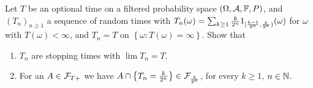  Let $T$ be an
optional time on a filtered probability space $(\Omega, \mathcal A, \mathbb F, P)$, and
$\left( T_n \right)_{n\geq 1}$ a sequence of random times with $T_n(\omega) =
\sum_{k\geq 1} \frac{k}{2^n} 1_{ [ \frac{k-1}{2^n}, \frac{k}{2^n} ) }(\omega)$ for
$\omega$ with $T(\omega)<\infty$, and $T_n=T$ on $\left\{ \omega : T(\omega)=\infty \right\}$.
Show that
\begin{enumerate}
    \item $T_n$ are stopping times with $\lim T_n = T$. 
    \item For an $A\in \mathcal F_{T+}$ we have $A \cap \left\{ T_n = \frac{k}{2^n} \right\} \in \mathcal F_{\frac{k}{2^n}}$,
        for every $k\geq 1$, $n\in\mathbb N$.
\end{enumerate}




